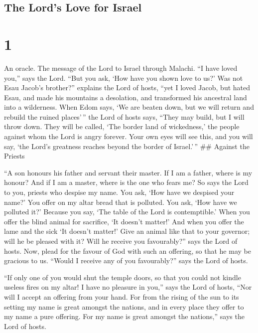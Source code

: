 \hypertarget{the-lords-love-for-israel}{%
\subsection{The Lord's Love for
Israel}\label{the-lords-love-for-israel}}

\hypertarget{section}{%
\section{1}\label{section}}

 An oracle. The message of the Lord to Israel through
Malachi.  ``I have loved you,'' says the Lord. ``But you
ask, `How have you shown love to us?' Was not Esau Jacob's brother?''
explains the Lord of hosts, ``yet I loved Jacob,  but hated
Esau, and made his mountains a desolation, and transformed his ancestral
land into a wilderness.  When Edom says, `We are beaten
down, but we will return and rebuild the ruined places'\,'' the Lord of
hosts says, ``They may build, but I will throw down. They will be
called, `The border land of wickedness,' the people against whom the
Lord is angry forever.  Your own eyes will see this, and you
will say, `the Lord's greatness reaches beyond the border of
Israel.'\,''  \#\# Against the Priests

``A son honours his father and servant their master. If I am a father,
where is my honour? And if I am a master, where is the one who fears me?
So says the Lord to you, priests who despise my name. You ask, `How have
we despised your name?'  You offer on my altar bread that is
polluted. You ask, `How have we polluted it?' Because you say, `The
table of the Lord is contemptible.'  When you offer the
blind animal for sacrifice, `It doesn't matter!' And when you offer the
lame and the sick `It doesn't matter!' Give an animal like that to your
governor; will he be pleased with it? Will he receive you favourably?''
says the Lord of hosts.  Now, plead for the favour of God
with such an offering, so that he may be gracious to us. ``Would I
receive any of you favourably?'' says the Lord of hosts.

 ``If only one of you would shut the temple doors, so that
you could not kindle useless fires on my altar! I have no pleasure in
you,'' says the Lord of hosts, ``Nor will I accept an offering from your
hand.  For from the rising of the sun to its setting my
name is great amongst the nations, and in every place they offer to my
name a pure offering. For my name is great amongst the nations,'' says
the Lord of hosts.

